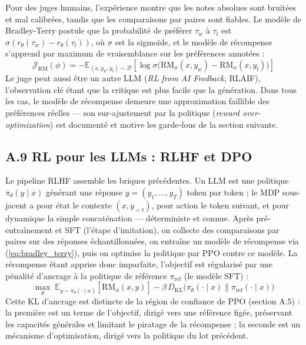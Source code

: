 \documentclass[11pt,a4paper]{article}
\begin{document}
Pour des juges humains, l'expérience montre que les notes absolues sont bruitées et mal calibrées, tandis que les comparaisons par paires sont fiables. Le modèle de Bradley-Terry postule que la probabilité de préférer $\tau_w$ à $\tau_l$ est $\sigma(r_\theta(\tau_w) - r_\theta(\tau_l))$, où $\sigma$ est la sigmoïde, et le modèle de récompense s'apprend par maximum de vraisemblance sur les préférences annotées :
\begin{equation}
\mathcal{J}_{\text{RM}}(\phi) = -\mathbb{E}_{(x, y_w, y_l) \sim \mathcal{D}} \left[ \log \sigma\big( \text{RM}_\phi(x, y_w) - \text{RM}_\phi(x, y_l) \big) \right]
\label{eq:bradley_terry}
\end{equation}
Le juge peut aussi être un autre LLM (\emph{RL from AI Feedback}, RLAIF), l'observation clé étant que la critique est plus facile que la génération. Dans tous les cas, le modèle de récompense demeure une approximation faillible des préférences réelles — son sur-ajustement par la politique (\emph{reward over-optimization}) est documenté et motive les garde-fous de la section suivante.

\subsection*{A.9 RL pour les LLMs : RLHF et DPO}
Le pipeline RLHF \cite{ouyang2022training} assemble les briques précédentes. Un LLM est une politique $\pi_\theta(y \mid x)$ générant une réponse $y = (y_1, \dots, y_T)$ token par token ; le MDP sous-jacent a pour état le contexte $(x, y_{<t})$, pour action le token suivant, et pour dynamique la simple concaténation — déterministe et connue. Après pré-entraînement et SFT (l'étape d'imitation), on collecte des comparaisons par paires sur des réponses échantillonnées, on entraîne un modèle de récompense via (\ref{eq:bradley_terry}), puis on optimise la politique par PPO contre ce modèle. La récompense étant apprise donc imparfaite, l'objectif est régularisé par une pénalité d'ancrage à la politique de référence $\pi_{\text{ref}}$ (le modèle SFT) :
\begin{equation}
\max_\theta \; \mathbb{E}_{y \sim \pi_\theta(\cdot \mid x)} \left[ \text{RM}_\phi(x, y) \right] - \beta \, D_{\text{KL}}\big( \pi_\theta(\cdot \mid x) \parallel \pi_{\text{ref}}(\cdot \mid x) \big)
\label{eq:rlhf_objective}
\end{equation}
Cette KL d'ancrage est distincte de la région de confiance de PPO (section A.5) : la première est un terme de l'objectif, dirigé vers une référence figée, préservant les capacités générales et limitant le piratage de la récompense ; la seconde est un mécanisme d'optimisation, dirigé vers la politique du lot précédent.
\end{document}
